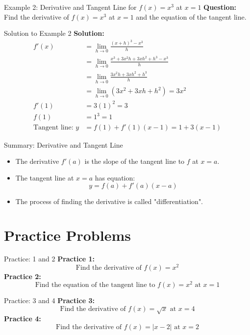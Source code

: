 \documentclass[aspectratio=169]{beamer}
\begin{document}
\begin{frame}{Example 2: Derivative and Tangent Line for $f(x) = x^3$ at $x=1$}
\textbf{Question:} Find the derivative of $f(x) = x^3$ at $x=1$ and the equation of the tangent line.
\end{frame}

\begin{frame}{Solution to Example 2}
\textbf{Solution:}
\\
\[
\begin{aligned}
  f'(x) &= \lim_{h \to 0} \frac{(x+h)^3 - x^3}{h} \\
        &= \lim_{h \to 0} \frac{x^3 + 3x^2h + 3xh^2 + h^3 - x^3}{h} \\
        &= \lim_{h \to 0} \frac{3x^2h + 3xh^2 + h^3}{h} \\
        &= \lim_{h \to 0} (3x^2 + 3xh + h^2) = 3x^2 \\
  f'(1) &= 3(1)^2 = 3 \\
  f(1) &= 1^3 = 1 \\
  \text{Tangent line: } y &= f(1) + f'(1)(x-1) = 1 + 3(x-1)
\end{aligned}
\]
\end{frame}

\begin{frame}{Summary: Derivative and Tangent Line}
\begin{itemize}
  \item The derivative $f'(a)$ is the slope of the tangent line to $f$ at $x=a$.
  \item The tangent line at $x=a$ has equation:
  \[
    y = f(a) + f'(a)(x-a)
  \]
  \item The process of finding the derivative is called "differentiation".
\end{itemize}
\end{frame}

\section{Practice Problems}

\begin{frame}{Practice: 1 and 2}
\textbf{Practice 1:}
\[
\text{Find the derivative of } f(x) = x^2 
\]
\vspace{1em}
\textbf{Practice 2:}
\[
\text{Find the equation of the tangent line to } f(x) = x^2 \text{ at } x=1
\]
\end{frame}

\begin{frame}{Practice: 3 and 4}
\textbf{Practice 3:}
\[
\text{Find the derivative of } f(x) = \sqrt{x} \text{ at } x=4
\]
\vspace{1em}
\textbf{Practice 4:}
\[
\text{Find the derivative of } f(x) = |x-2| \text{ at } x=2
\]
\end{frame}
\end{document}
